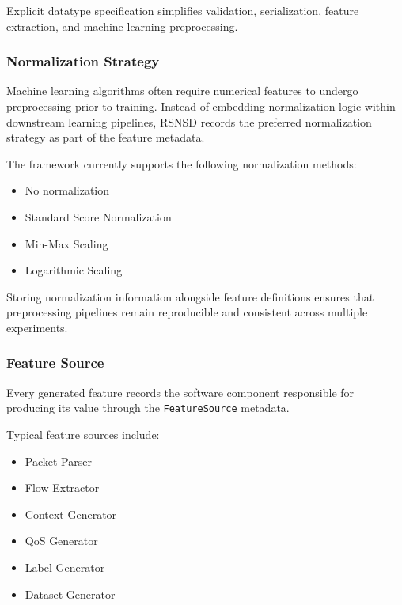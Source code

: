\documentclass[12pt,a4paper]{article}
\begin{document}
Explicit datatype specification simplifies validation, serialization, feature extraction, and machine learning preprocessing.

\subsubsection{Normalization Strategy}

Machine learning algorithms often require numerical features to undergo preprocessing prior to training. Instead of embedding normalization logic within downstream learning pipelines, RSNSD records the preferred normalization strategy as part of the feature metadata.

The framework currently supports the following normalization methods:

\begin{itemize}
	
	\item No normalization
	
	\item Standard Score Normalization
	
	\item Min-Max Scaling
	
	\item Logarithmic Scaling
	
\end{itemize}

Storing normalization information alongside feature definitions ensures that preprocessing pipelines remain reproducible and consistent across multiple experiments.

\subsubsection{Feature Source}

Every generated feature records the software component responsible for producing its value through the \texttt{FeatureSource} metadata.

Typical feature sources include:

\begin{itemize}
	
	\item Packet Parser
	
	\item Flow Extractor
	
	\item Context Generator
	
	\item QoS Generator
	
	\item Label Generator
	
	\item Dataset Generator
	
\end{itemize}
\end{document}
